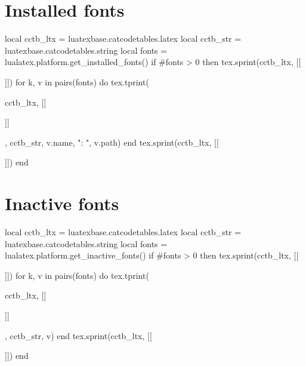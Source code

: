 \documentclass{article}
\begin{document}
\section{Installed fonts}

\begin{luacode*}
  local cctb_ltx = luatexbase.catcodetables.latex
  local cctb_str = luatexbase.catcodetables.string
  local fonts = lualatex.platform.get_installed_fonts()
  if #fonts > 0 then
     tex.sprint(cctb_ltx, [[\begin{itemize}]])
       for k, v in pairs(fonts) do
          tex.tprint({cctb_ltx, [[\item\relax]]}, {cctb_str, v.name, ": ", v.path})
       end
     tex.sprint(cctb_ltx, [[\end{itemize}]])
  end
\end{luacode*}

\section{Inactive fonts}

\begin{luacode*}
  local cctb_ltx = luatexbase.catcodetables.latex
  local cctb_str = luatexbase.catcodetables.string
  local fonts = lualatex.platform.get_inactive_fonts()
  if #fonts > 0 then
     tex.sprint(cctb_ltx, [[\begin{itemize}]])
       for k, v in pairs(fonts) do
          tex.tprint({cctb_ltx, [[\item\relax]]}, {cctb_str, v})
       end
    tex.sprint(cctb_ltx, [[\end{itemize}]])
  end
\end{luacode*}
\end{document}
